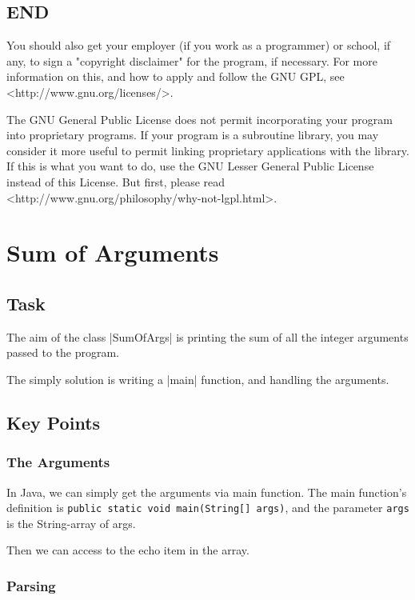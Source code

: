 \documentclass{ctexart}
\begin{document}
\subsection{END}
 
  You should also get your employer (if you work as a programmer) or school,
if any, to sign a "copyright disclaimer" for the program, if necessary.
For more information on this, and how to apply and follow the GNU GPL, see
<http://www.gnu.org/licenses/>.

  The GNU General Public License does not permit incorporating your program
into proprietary programs.  If your program is a subroutine library, you
may consider it more useful to permit linking proprietary applications with
the library.  If this is what you want to do, use the GNU Lesser General
Public License instead of this License.  But first, please read
<http://www.gnu.org/philosophy/why-not-lgpl.html>.
\newpage

\tableofcontents
\newpage


\section{Sum of Arguments}

\subsection{Task}

The aim of the class \lstlisinginline|SumOfArgs| is printing the sum of
all the integer arguments passed to the program.

The simply solution is writing a \lstlistinline|main| function, and handling the arguments.

\subsection{Key Points}

\subsubsection{The Arguments}

In Java, we can simply get the arguments via main function.
The main function's definition is 
\lstinline|public static void main(String[] args)|,
and the parameter \lstinline|args| is the String-array of args.

Then we can access to the echo item in the array.

\subsubsection{Parsing}
\end{document}
